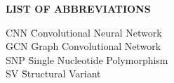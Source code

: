 {}

\begin{center}
{\normalfont \textbf{LIST OF ABBREVIATIONS}}
\end{center}

\newcommand{\Ab}[2]{\noindent  #1 \> #2 \\}
\newcommand{\Abi}[2]{\noindent #1 \hspace{1.5cm} \= #2 \\}

\begin{tabbing}
\Abi{CNN}{Convolutional Neural Network}
\Abi{GCN}{Graph Convolutional Network}
\Abi{SNP}{Single Nucleotide Polymorphism}
\Abi{SV}{Structural Variant}
\end{tabbing}

\clearpage
